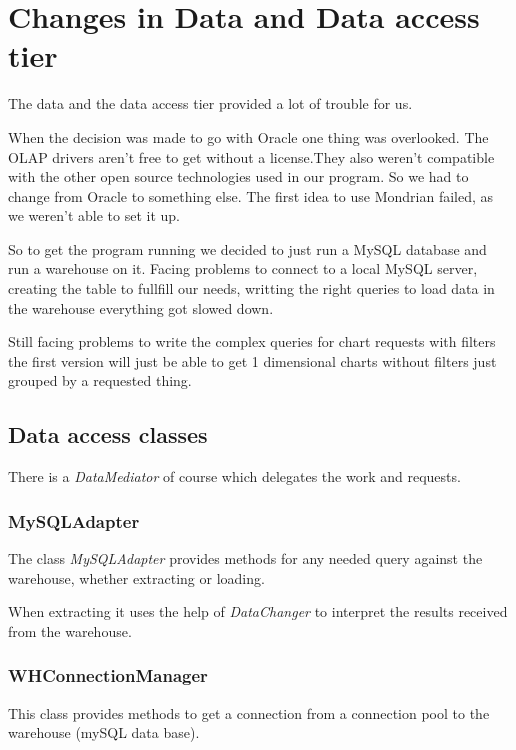 \section{Changes in Data and Data access tier}


The data and the data access tier provided a lot of trouble for us.

When the decision was made to go with Oracle one thing was overlooked. The
OLAP drivers aren't free to get without a license.They also weren't compatible
with the other open source technologies used in our program. So we had to 
change from Oracle to something else. The first idea to use Mondrian failed,
as we weren't able to set it up.

So to get the program running we decided to just run a MySQL database and 
run a warehouse on it. Facing problems to connect to a local MySQL server,
creating the table to fullfill our needs, writting the right queries to
load data in the warehouse everything got slowed down.

Still facing problems to write the complex queries for chart requests with filters
the first version will just be able to get 1 dimensional charts without filters
just grouped by a requested thing. 
 

\subsection{Data access classes}
There is a \textit{DataMediator} of course which delegates the work and requests.

\subsubsection{MySQLAdapter}
The class \textit{MySQLAdapter} provides methods for any needed query against
the warehouse, whether extracting or loading.

When extracting it uses the help of \textit{DataChanger} to interpret the
results received from the warehouse.

\subsubsection{WHConnectionManager}
This class provides methods to get a connection from a connection pool to
the warehouse (mySQL data base).
